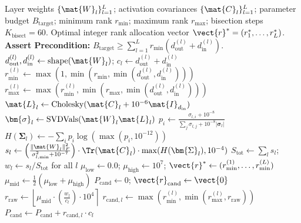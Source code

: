 \begin{algorithm}[H]
\caption[Layerwise Sensitivity-Aware Rank Allocation (ASVD)]{Layerwise Sensitivity-Aware Rank Allocation (ASVD)}
\label{alg:rank_allocation}
\begin{algorithmic}[1]
\REQUIRE Layer weights $\{\mat{W}_l\}_{l=1}^L$; activation covariances $\{\mat{C}_l\}_{l=1}^L$; parameter budget $B_{\text{target}}$; minimum rank $r_{\min}$; maximum rank $r_{\max}$; bisection steps $K_{\text{bisect}} = 60$.
\ENSURE Optimal integer rank allocation vector $\vect{r}^* = (r_1^*, \dots, r_L^*)$.
\STATE \textbf{Assert Precondition:} $B_{\text{target}} \ge \sum_{l=1}^L r_{\min}(d_{\text{out}}^{(l)} + d_{\text{in}}^{(l)})$.
    \STATE $d_{\text{out}}^{(l)}, d_{\text{in}}^{(l)} \leftarrow \text{shape}(\mat{W}_l)$; $c_l \leftarrow d_{\text{out}}^{(l)} + d_{\text{in}}^{(l)}$ 
    \STATE $r_{\min}^{(l)} \leftarrow \max(1, \min(r_{\min}, \min(d_{\text{out}}^{(l)}, d_{\text{in}}^{(l)})))$
    \STATE $r_{\max}^{(l)} \leftarrow \max(r_{\min}^{(l)}, \min(r_{\max}, \min(d_{\text{out}}^{(l)}, d_{\text{in}}^{(l)})))$
    \STATE $\mat{L}_l \leftarrow \text{Cholesky}(\mat{C}_l + 10^{-6}\mat{I}_{d_{\text{in}}})$
    \STATE $\bm{\sigma}_l \leftarrow \text{SVDVals}(\mat{W}_l \mat{L}_l)$ 
    \STATE $p_i \leftarrow \frac{\sigma_{l, i} + 10^{-8}}{\sum_j \sigma_{l, j} + 10^{-8}|\bm{\sigma}_l|}$ 
    \STATE $H(\bm{\Sigma}_l) \leftarrow - \sum_i p_i \log(\max(p_i, 10^{-12}))$ 
    \STATE $s_l \leftarrow \left(\frac{\|\mat{W}_l\|_F^2}{\sigma_{l, \min}^2 + 10^{-7}}\right) \cdot \Tr(\mat{C}_l) \cdot \max(H(\bm{\Sigma}_l), 10^{-4})$ 
\ENDFOR
\STATE $S_{\text{tot}} \leftarrow \sum_l s_l$; $w_l \leftarrow s_l / S_{\text{tot}}$ for all $l$
\STATE $\mu_{\text{low}} \leftarrow 0.0$; $\mu_{\text{high}} \leftarrow 10^7$; $\vect{r}^* \leftarrow (r_{\min}^{(1)}, \dots, r_{\min}^{(L)})$
    \STATE $\mu_{\text{mid}} \leftarrow \frac{1}{2}(\mu_{\text{low}} + \mu_{\text{high}})$
    \STATE $P_{\text{cand}} \leftarrow 0$; $\vect{r}_{\text{cand}} \leftarrow \vect{0}$
        \STATE $r_{\text{raw}} \leftarrow \left\lfloor \mu_{\text{mid}} \cdot \left(\frac{w_l}{c_l}\right) \cdot 10^4 \right\rceil$
        \STATE $r_{\text{cand}, l} \leftarrow \max(r_{\min}^{(l)}, \min(r_{\max}^{(l)}, r_{\text{raw}}))$
        \STATE $P_{\text{cand}} \leftarrow P_{\text{cand}} + r_{\text{cand}, l} \cdot c_l$

\end{algorithmic}
\end{algorithm}
